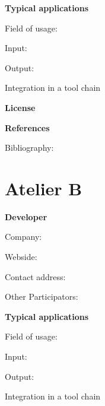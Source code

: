 \documentclass{./template/openetcs_report}
\begin{document}
	\textbf{Typical applications}

	Field of usage:


	Input:

	Output:





	Integration in a tool chain



	\textbf{License}


	\textbf{References}

	Bibliography:


\section{Atelier B}

	\textbf{Developer}

	Company: 

	Webside:

	Contact address:

	Other  Participators:



	\textbf{Typical applications}

	Field of usage:


	Input:

	Output:





	Integration in a tool chain
\end{document}
